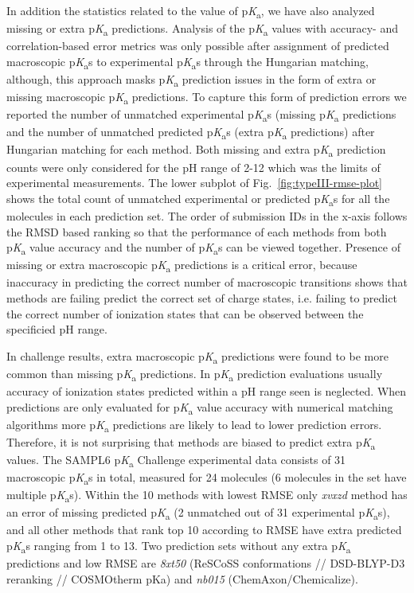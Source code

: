 \documentclass[9pt,lineno,final]{elife}
\newcommand{\pKa}{p\textit{K}\textsubscript{a}}
\begin{document}
In addition the statistics related to the value of \pKa{}, we have also analyzed missing or extra \pKa{} predictions. 
Analysis of the \pKa{} values with accuracy- and correlation-based error metrics was only possible after assignment of predicted macroscopic \pKa{}s to experimental \pKa{}s through the Hungarian matching, although, this approach masks \pKa{} prediction issues in the form of extra or missing macroscopic \pKa{} predictions. 
To capture this form of prediction errors we reported the number of unmatched experimental \pKa{}s (missing \pKa{} predictions and the number of unmatched predicted \pKa{}s (extra \pKa{} predictions) after Hungarian matching for each method. 
Both missing and extra \pKa{} prediction counts were only considered for the pH range of 2-12 which was the limits of experimental measurements.
The lower subplot of Fig.~\ref{fig:typeIII-rmse-plot} shows the total count of unmatched experimental or predicted \pKa{}s for all the molecules in each prediction set. The order of submission IDs in the x-axis follows the RMSD based ranking so that the performance of each methods from both \pKa{} value accuracy and the number of \pKa{}s can be viewed together.
Presence of missing or extra macroscopic \pKa{} predictions is a critical error, because inaccuracy in predicting the correct number of macroscopic transitions shows that methods are failing predict the correct set of charge states, i.e. failing to predict the correct number of ionization states that can be observed between the specificied pH range. 

In challenge results, extra macroscopic \pKa{} predictions were found to be more common than missing \pKa{} predictions. 
In \pKa{} prediction evaluations usually accuracy of ionization states predicted within a pH range seen is neglected. 
When predictions are only evaluated for \pKa{} value accuracy with numerical matching algorithms more \pKa{} predictions are likely to lead to lower prediction errors. 
Therefore, it is not surprising that methods are biased to predict extra \pKa{} values. 
The SAMPL6 \pKa{} Challenge experimental data consists of 31 macroscopic \pKa{}s in total, measured for 24 molecules (6 molecules in the set have multiple \pKa{}s).
Within the 10 methods with lowest RMSE only \textit{xvxzd} method has an error of missing predicted \pKa{} (2 unmatched out of 31 experimental \pKa{}s), and all other methods that rank top 10 according to RMSE have extra predicted \pKa{}s ranging from 1 to 13. Two prediction sets without any extra \pKa{} predictions and low RMSE are \textit{8xt50} (ReSCoSS conformations // DSD-BLYP-D3 reranking // COSMOtherm pKa) and \textit{nb015} (ChemAxon/Chemicalize).
\end{document}
